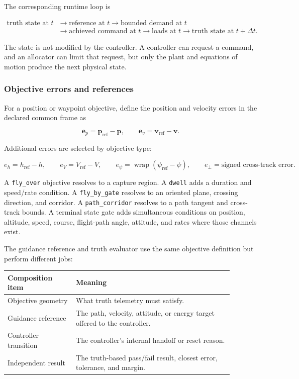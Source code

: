 \documentclass[11pt]{article}
\begin{document}
The corresponding runtime loop is

\[
\begin{aligned}
  \text{truth state at }t
    &\longrightarrow \text{reference at }t
    \longrightarrow \text{bounded demand at }t \\
    &\longrightarrow \text{achieved command at }t
    \longrightarrow \text{loads at }t
    \longrightarrow \text{truth state at }t+\Delta t.
\end{aligned}
\]

The state is not modified by the controller. A controller can request a
command, and an allocator can limit that request, but only the plant and
equations of motion produce the next physical state.

\subsubsection{Objective errors and references}

For a position or waypoint objective, define the position and velocity errors
in the declared common frame as

\[
  \boldsymbol e_p=\boldsymbol p_{\mathrm{ref}}-\boldsymbol p,
  \qquad
  \boldsymbol e_v=\boldsymbol v_{\mathrm{ref}}-\boldsymbol v.
\]

Additional errors are selected by objective type:

\[
  e_h=h_{\mathrm{ref}}-h,\qquad
  e_V=V_{\mathrm{ref}}-V,\qquad
  e_\psi=\operatorname{wrap}(\psi_{\mathrm{ref}}-\psi),
  \qquad
  e_\perp=\text{signed cross-track error}.
\]

A \texttt{fly\_over} objective resolves to a capture region. A
\texttt{dwell} adds a duration and speed/rate condition. A
\texttt{fly\_by\_gate} resolves to an oriented plane, crossing direction,
and corridor. A \texttt{path\_corridor} resolves to a path tangent and
cross-track bounds. A terminal state gate adds simultaneous conditions on
position, altitude, speed, course, flight-path angle, attitude, and rates
where those channels exist.

The guidance reference and truth evaluator use the same objective definition
but perform different jobs:

\begin{center}
\begin{tabular}{p{0.27\linewidth}p{0.62\linewidth}}
\toprule
\textbf{Composition item} & \textbf{Meaning} \\
\midrule
Objective geometry & What truth telemetry must satisfy. \\
Guidance reference & The path, velocity, attitude, or energy target offered to the controller. \\
Controller transition & The controller's internal handoff or reset reason. \\
Independent result & The truth-based pass/fail result, closest error, tolerance, and margin. \\
\bottomrule
\end{tabular}
\end{center}
\end{document}
